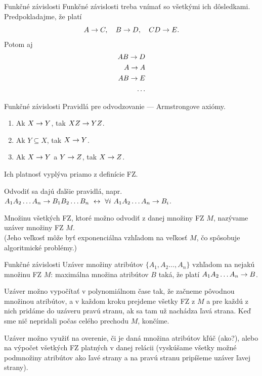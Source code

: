 \documentclass[12pt]{beamer}
\begin{document}
\begin{frame}[fragile]{Funkčné závislosti}
Funkčné závislosti treba vnímať so všetkými ich dôsledkami. Predpokladajme, že platí
$$
A\rightarrow C,\quad B\rightarrow D,\quad CD\rightarrow E.
$$
Potom aj
\begin{eqnarray*}
AB\rightarrow D\\
A\rightarrow A\\
AB\rightarrow E\\
\dots
\end{eqnarray*}
\end{frame}

\begin{frame}[fragile]{Funkčné závislosti}
Pravidlá pre odvodzovanie --- Armstrongove axiómy.
\begin{enumerate}
\item Ak $X\rightarrow Y$, tak $XZ\rightarrow YZ$.
\item Ak $Y \subseteq X$, tak $X\rightarrow Y$.
\item Ak $X\rightarrow Y$ a $Y\rightarrow Z$, tak $X\rightarrow Z$.
\end{enumerate}
Ich platnosť vyplýva priamo z definície FZ.
\bigskip

Odvodiť sa dajú ďalšie pravidlá, napr.
$A_1A_2\dots A_n\fz B_1B_2\dots B_n\ \leftrightarrow\ \forall i\ A_1A_2\dots A_n\fz B_i$.
\bigskip

Množinu všetkých FZ, ktoré možno odvodiť z danej množiny FZ $M$, nazývame \alert{uzáver množiny FZ} $M$.\\
(Jeho veľkosť môže byť exponenciálna vzhľadom na veľkosť $M$, čo spôsobuje algoritmické problémy.)
\end{frame}

\begin{frame}[fragile]{Funkčné závislosti}
\alert{Uzáver množiny atribútov} $\{A_1,A_2\dots,A_n\}$ vzhľadom na nejakú množinu FZ $M$:
maximálna množina atribútov $B$ taká, že platí $A_1A_2\dots A_n\rightarrow B$.

\bigskip
Uzáver možno vypočítať v polynomiálnom čase tak, že začneme pôvodnou množinou atribútov,
a v každom kroku prejdeme všetky FZ z $M$ a pre každú z nich pridáme do uzáveru pravú stranu,
ak sa tam už nachádza ľavá strana. Keď sme nič nepridali počas celého prechodu $M$, končíme.

\bigskip
Uzáver možno využiť na overenie, či je daná množina atribútov kľúč (ako?),
alebo na výpočet všetkých FZ platných v danej relácii
(vyskúšame všetky možné podmnožiny atribútov ako ľavé strany
a na pravú stranu pripíšeme uzáver ľavej strany).
\end{frame}
\end{document}

